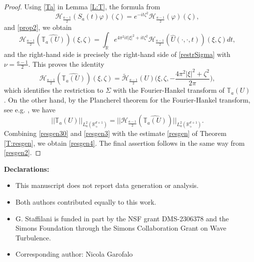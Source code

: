 \documentclass[11pt,letter]{amsart}
\def \RN {\mathbb{R}_+^{d+1}}
\def \R {\mathbb{R}}
\def \vf{\varphi}
\numberwithin{equation}{section}
\numberwithin{equation}{section}
\begin{document}
\begin{proof}
Using \eqref{Ta} in Lemma \ref{L:T}, the formula from \cite{GS}
\begin{equation}\label{hank}
\mathcal H_{\frac{a-1}2}(S_a(t) \vf)(\zeta) = e^{-i t \zeta^2} \mathcal H_{\frac{a-1}2}(\vf)(\zeta),
\end{equation}
and \eqref{prop2}, we obtain
\[
\mathcal H_{\frac{a-1}2}(\widehat{\mathbb T_a(U)})(\xi,\zeta) = \int_\R e^{4\pi^2 i t |\xi|^2 + i t \zeta^2} \mathcal H_{\frac{a-1}2}(\hat U(\cdot,\cdot,t))(\xi,\zeta) dt,
\]
and the right-hand side is precisely the right-hand side of \eqref{restrSigma} with $\nu = \frac{a-1}2$. This proves the identity
\begin{equation}\label{resgen30}
\mathcal H_{\frac{a-1}2}(\widehat{\mathbb T_a(U)})(\xi,\zeta) = \tilde{\mathcal H}_{\frac{a-1}2}(U)\Big(\xi,\zeta,- \frac{4\pi^2 |\xi|^2 +\zeta^2}{2\pi}\Big),
\end{equation}
which identifies the restriction to $\Sigma$ with the Fourier-Hankel transform of $\mathbb T_a(U)$. On the other hand, by the Plancherel theorem for the Fourier-Hankel transform, see e.g. \cite{GS}, we have
\begin{equation}\label{resgen3}
||\mathbb T_a(U)||_{L^2_a(\RN)} = ||\mathcal H_{\frac{a-1}2}(\widehat{\mathbb T_a(U)})||_{L^2_a(\RN)}.
\end{equation}
Combining \eqref{resgen30} and \eqref{resgen3} with the estimate \eqref{resgen} of Theorem \ref{T:resgen}, we obtain \eqref{resgen4}. The final assertion follows in the same way from \eqref{resgen2}.
\end{proof}

\vskip 0.3in

\noindent \textbf{Declarations:}
\begin{itemize}
\item[(1)]  This manuscript does not report data generation or analysis.
\item[(2)] Both authors contributed equally to this work.
\item[(3)] G. Staffilani is funded in part by the NSF grant DMS-2306378 and the Simons Foundation through the
Simons Collaboration Grant on Wave Turbulence.
\item[(4)] Corresponding author: Nicola Garofalo
\end{itemize}


\end{document}
